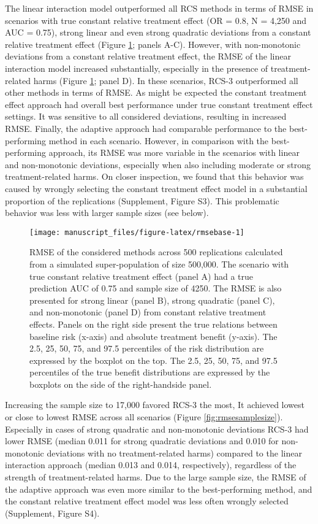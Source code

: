 \documentclass[]{elsarticle} %
\begin{document}
The linear interaction model outperformed all RCS methods in terms of
RMSE in scenarios with true constant relative treatment effect (OR =
0.8, N = 4,250 and AUC = 0.75), strong linear and even strong quadratic
deviations from a constant relative treatment effect (Figure
\ref{fig:rmsebase}; panels A-C). However, with non-monotonic deviations
from a constant relative treatment effect, the RMSE of the linear
interaction model increased substantially, especially in the presence of
treatment-related harms (Figure \ref{fig:rmsebase}; panel D). In these
scenarios, RCS-3 outperformed all other methods in terms of RMSE. As
might be expected the constant treatment effect approach had overall
best performance under true constant treatment effect settings. It was
sensitive to all considered deviations, resulting in increased RMSE.
Finally, the adaptive approach had comparable performance to the
best-performing method in each scenario. However, in comparison with the
best-performing approach, its RMSE was more variable in the scenarios
with linear and non-monotonic deviations, especially when also including
moderate or strong treatment-related harms. On closer inspection, we
found that this behavior was caused by wrongly selecting the constant
treatment effect model in a substantial proportion of the replications
(Supplement, Figure S3). This problematic behavior was less with larger
sample sizes (see below).

\begin{figure}
\texttt{[image: manuscript\_files/figure-latex/rmsebase-1]} \caption{RMSE of the considered methods across 500 replications calculated from a simulated super-population of size 500,000. The scenario with true constant relative treatment effect (panel A) had a true prediction AUC of 0.75 and sample size of 4250. The RMSE is also presented for strong linear (panel B), strong quadratic (panel C), and non-monotonic (panel D) from constant relative treatment effects. Panels on the right side present the true relations between baseline risk (x-axis) and absolute treatment benefit (y-axis). The 2.5, 25, 50, 75, and 97.5 percentiles of the risk distribution are expressed by the boxplot on the top. The 2.5, 25, 50, 75, and 97.5 percentiles of the true benefit distributions are expressed by the boxplots on the side of the right-handside panel.}\label{fig:rmsebase}
\end{figure}

Increasing the sample size to 17,000 favored RCS-3 the most, It achieved
lowest or close to lowest RMSE across all scenarios (Figure
\ref{fig:rmsesamplesize}). Especially in cases of strong quadratic and
non-monotonic deviations RCS-3 had lower RMSE (median 0.011 for strong
quadratic deviations and 0.010 for non-monotonic deviations with no
treatment-related harms) compared to the linear interaction approach
(median 0.013 and 0.014, respectively), regardless of the strength of
treatment-related harms. Due to the large sample size, the RMSE of the
adaptive approach was even more similar to the best-performing method,
and the constant relative treatment effect model was less often wrongly
selected (Supplement, Figure S4).
\end{document}
